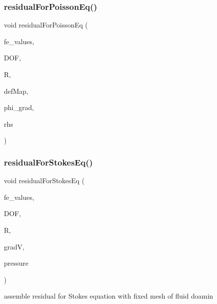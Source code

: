 \mbox{\label{class_residual_ada0899a86c88ceb84cc3c1155663b8ba}} 
\subsubsection{\texorpdfstring{residual\+For\+Poisson\+Eq()}{residualForPoissonEq()}\hspace{0.1cm}{\footnotesize\ttfamily [4/4]}}
{\footnotesize\ttfamily void residual\+For\+Poisson\+Eq (\begin{DoxyParamCaption}\item[{const F\+E\+Values$<$ dim $>$ \&}]{fe\+\_\+values,  }\item[{unsigned int}]{D\+OF,  }\item[{dealii\+::\+Table$<$ 1, T $>$ \&}]{R,  }\item[{\mbox{\hyperlink{structdeformation_map}{deformation\+Map}}$<$ T, dim $>$ \&}]{def\+Map,  }\item[{dealii\+::\+Table$<$ 3, T $>$ \&}]{phi\+\_\+grad,  }\item[{dealii\+::\+Table$<$ 2, T $>$ \&}]{rhs }\end{DoxyParamCaption})}

\mbox{\label{class_residual_a9a8f493fb66e0bd394948af13a27d821}} 
\subsubsection{\texorpdfstring{residual\+For\+Stokes\+Eq()}{residualForStokesEq()}\hspace{0.1cm}{\footnotesize\ttfamily [1/2]}}
{\footnotesize\ttfamily void residual\+For\+Stokes\+Eq (\begin{DoxyParamCaption}\item[{const F\+E\+Values$<$ dim $>$ \&}]{fe\+\_\+values,  }\item[{unsigned int}]{D\+OF,  }\item[{Table$<$ 1, T $>$ \&}]{R,  }\item[{Table$<$ 3, T $>$ \&}]{gradV,  }\item[{dealii\+::\+Table$<$ 1, T $>$ \&}]{pressure }\end{DoxyParamCaption})}

assemble residual for Stokes equation with fixed mesh of fluid doamin \mbox{\label{class_residual_a95ad863ab9066d2dbfef9db3907a911f}} 
